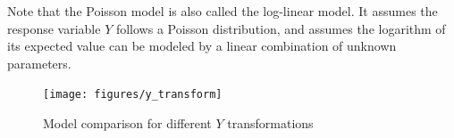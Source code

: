 \documentclass [11pt, proquest] {uwthesis}[2015/03/03]
\begin{document}
Note that the Poisson model is also called the log-linear model. It assumes the response variable $Y$ follows a Poisson distribution, and assumes the logarithm of its expected value can be modeled by a linear combination of unknown parameters.



\begin{figure}
   \texttt{[image: figures/y\_transform]} 
  \caption{Model comparison for different $Y$ transformations}
  \label{fig:y_transform}
\end{figure}
\end{document}
